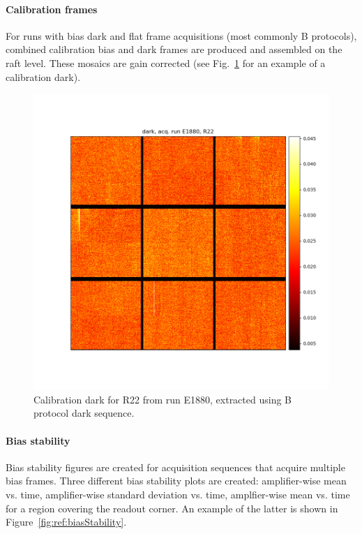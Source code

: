 \paragraph{Calibration frames}

For runs with bias dark and flat frame acquisitions (most commonly B protocols), combined calibration bias and dark frames are produced and assembled on the raft level. These mosaics are gain corrected (see Fig.~\ref{fig:ref:calibFrame} for an example of a calibration dark).

\begin{figure}[ht]
    \centering
    \includegraphics[width=0.8\linewidth]{figures/ReferenceFigures/eoDarkRaftMosaic_LSSTCam_R22_S00_u_lsstccs_eo_raft_calib_mosaics_E1880_w_2024_35_20241101T020324Z.png}
    \caption{Calibration dark for R22 from run E1880, extracted using B protocol dark sequence.}
    \label{fig:ref:calibFrame}
\end{figure}
\clearpage
\paragraph{Bias stability}

Bias stability figures are created for acquisition sequences that acquire multiple bias frames. Three different bias stability plots are created: amplifier-wise mean vs. time, amplifier-wise standard deviation vs. time, amplfier-wise mean vs. time for a region covering the readout corner.  An example of the latter is shown in Figure~\ref{fig:ref:biasStability}.

